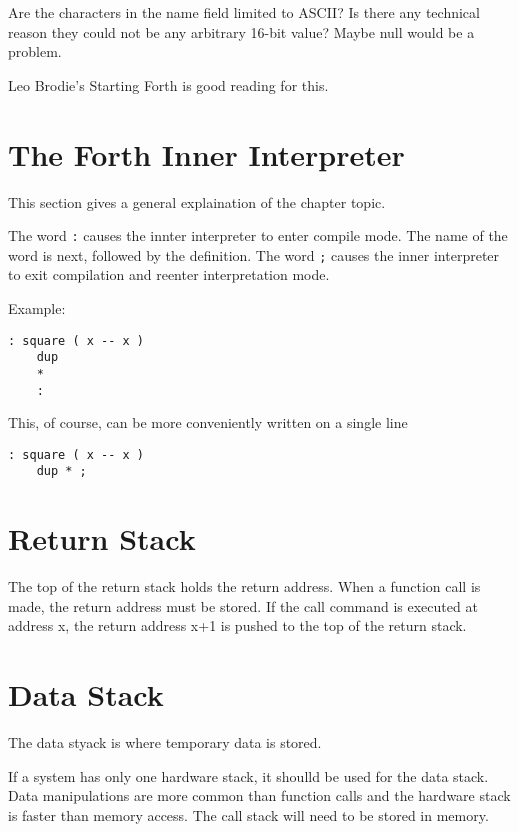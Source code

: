 Are the characters in the name field limited to ASCII? Is there any technical reason they
could not be any arbitrary 16-bit value? Maybe null would be a problem.

Leo Brodie's Starting Forth is good reading for this.

%
\section{The Forth Inner Interpreter}
This section gives a general explaination 
of the chapter topic.

The word \lstinline|:| causes the innter interpreter to enter compile mode. The name of the
word is next, followed by the definition. The word \lstinline|;| causes the inner
interpreter to exit compilation and reenter interpretation mode.

Example:
\begin{lstlisting}[caption={Definition of \lstinline|dup| in Forth.}]
: square ( x -- x )
    dup
    *
    :
\end{lstlisting}

This, of course, can be more conveniently written on a single line
\begin{lstlisting}[style=kaolstplain,linewidth=1.5\textwidth]
: square ( x -- x )
    dup * ;
\end{lstlisting}

\section{Return Stack}
The top of the return stack holds the return address. When a function call is made, the return address
must be stored.  If the call command is executed at address x, the return address x+1 is pushed to the top of the return stack.

\section{Data Stack}
The data styack is where temporary data is stored.

If a system has only one hardware stack, it shoulld be used for the data stack. Data 
manipulations are more common than function calls and the hardware stack is faster 
than memory access. The call stack will need to be stored in memory.

